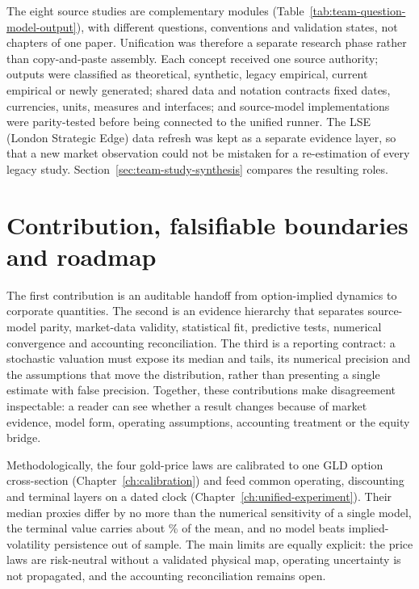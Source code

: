 The eight source studies are complementary modules
(Table~\ref{tab:team-question-model-output}), with different questions,
conventions and validation states, not chapters of one paper. Unification was
therefore a separate research phase rather than copy-and-paste assembly. Each
concept received one source authority; outputs were classified as
theoretical, synthetic, legacy empirical, current empirical or newly
generated; shared data and notation contracts fixed dates, currencies, units,
measures and interfaces; and source-model implementations were parity-tested
before being connected to the unified runner. The LSE (London Strategic Edge)
data refresh was kept as a separate evidence layer, so that a new market
observation could not be mistaken for a re-estimation of every legacy study.
Section~\ref{sec:team-study-synthesis} compares the resulting roles.

\section{Contribution, falsifiable boundaries and roadmap}

The first contribution is an auditable handoff from option-implied dynamics to
corporate quantities. The second is an evidence hierarchy that separates
source-model parity, market-data validity, statistical fit, predictive tests,
numerical convergence and accounting reconciliation. The third is a reporting
contract: a stochastic valuation must expose its median and tails, its
numerical precision and the assumptions that move the distribution, rather
than presenting a single estimate with false precision.
Together, these contributions make disagreement inspectable: a reader can see
whether a result changes because of market evidence, model form, operating
assumptions, accounting treatment or the equity bridge.

Methodologically, the four gold-price laws are calibrated to one GLD option
cross-section (Chapter~\ref{ch:calibration}) and feed common operating,
discounting and terminal layers on a dated clock
(Chapter~\ref{ch:unified-experiment}). Their median proxies differ by no more
than the numerical sensitivity of a single model, the terminal value carries
about \TerminalShare\% of the mean, and no model beats implied-volatility persistence out of sample. The main
limits are equally explicit: the price laws are risk-neutral without a
validated physical map, operating uncertainty is not propagated, and the
accounting reconciliation remains open.

